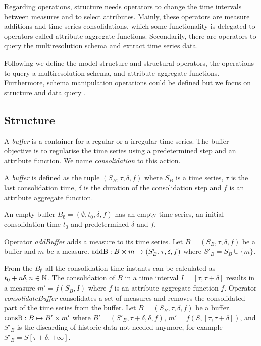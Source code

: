 Regarding operations,  structure needs operators to change
the time intervals between measures and to select attributes. Mainly,
these operators are measure additions and time series consolidations,
which some functionality is delegated to operators called attribute
aggregate functions. Secondarily, there are operators to query the
multiresolution schema and extract time series data.


Following we define the  model structure and structural
operators, the operations to query a multiresolution schema, and
attribute aggregate functions.  Furthermore, schema manipulation
operations could be defined but we focus on structure and data query .


\subsection{Structure}

A \emph{buffer} is a container for a regular or a irregular time
series. The buffer objective is to regularise the time series using a
predetermined step and an attribute function. We name
\emph{consolidation} to this action.
\begin{definition}%
  A \emph{buffer} is defined as the tuple $(S_B,\tau,\delta,f)$ where
  $S_B$ is a time series, $\tau$ is the last consolidation time,
  $\delta$ is the duration of the consolidation step and $f$ is an
  attribute aggregate function.

  An empty buffer $B_{\emptyset} = (\emptyset,t_0, \delta, f)$ has an
  empty time series, an initial consolidation time $t_0$ and
  predetermined $\delta$ and $f$.
\end{definition}

Operator \emph{addBuffer} adds a measure to its time series. Let $B=
(S_B,\tau,\delta,f)$ be a buffer and $m$ be a measure. $\operatorname{addB}: B
\times m \mapsto (S'_B,\tau,\delta,f)$ where $S'_B = S_B \cup \{m\} $.

From the $B_{\emptyset}$ all the consolidation time instants can be
calculated as $t_0+n\delta, n\in\mathbb{N}$. The consolidation of $B$ in a
time interval $I=[\tau,\tau+\delta]$ results in a measure
$m'=f(S_B,I)$ where $f$ is an attribute aggregate function
$f$. Operator \emph{consolidateBuffer} consolidates a set of measures
and removes the consolidated part of the time series from the
buffer. Let $B=(S_B,\tau,\delta,f)$ be a buffer. $\operatorname{consB} : B \mapsto
B' \times m'$ where $ B'= (S'_B,\tau+\delta,\delta,f)$, $m' =
f(S,[\tau,\tau+\delta])$, and $S'_B$ is the discarding of historic
data not needed anymore, for example $S'_B = S[\tau+\delta,+\infty]$.

